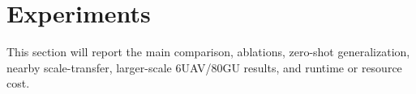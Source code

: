 \section{Experiments}

This section will report the main comparison, ablations, zero-shot
generalization, nearby scale-transfer, larger-scale 6UAV/80GU results, and
runtime or resource cost.
